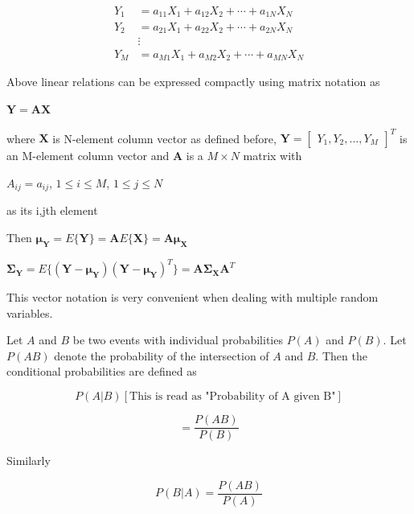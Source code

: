 \documentclass[fleqn]{article}
\begin{document}
	\begin{equation*}
		\begin{aligned}
			Y_1 &= a_{11}X_1 + a_{12}X_2 + \cdots + a_{1N}X_N \\
			Y_2 &= a_{21}X_1 + a_{22}X_2 + \cdots + a_{2N}X_N \\
			&\vdots \\
			Y_M &= a_{M1}X_1 + a_{M2}X_2 + \cdots + a_{MN}X_N
		\end{aligned}
	\end{equation*}
	
	Above linear relations can be expressed compactly using matrix notation as
	
	$\mathbf{Y} = \mathbf{AX}$
	
	where $\mathbf{X}$ is N-element column vector as defined before, $\mathbf{Y} = \begin{bmatrix}Y_1,Y_2,...,Y_M\end{bmatrix}^T$ is an M-element column vector and $\mathbf{A}$ is a $M \times N$ matrix with
	
	$A_{ij} = a_{ij}$, $1 \leq i \leq M$, $1 \leq j \leq N$
	
	as its i,jth element
	
	Then $\mathbf{\boldsymbol{\mu}_Y} = E\{\mathbf{Y}\} = \mathbf{A}E\{\mathbf{X}\} = \mathbf{A}\mathbf{\boldsymbol{\mu}_X}$
	
	$\mathbf{\Sigma_Y} = E\{(\mathbf{Y} - \mathbf{\boldsymbol{\mu}_Y})(\mathbf{Y} - \mathbf{\boldsymbol{\mu}_Y})^T\} = \mathbf{A}\mathbf{\Sigma_X}\mathbf{A}^T$
	
	This vector notation is very convenient when dealing with multiple random variables.
	
	Let $A$ and $B$ be two events with individual probabilities $P(A)$ and $P(B)$. Let $P(AB)$ denote the probability of the intersection of $A$ and $B$. Then the conditional probabilities are defined as
	
	\begin{equation*}
		P(A|B) \left[\text{This is read as "Probability of A given B"}\right]
	\end{equation*}
	
	\begin{equation*}
		= \frac{P(AB)}{P(B)}
	\end{equation*}
	
	Similarly
	
	\begin{equation*}
		P(B|A) = \frac{P(AB)}{P(A)}
	\end{equation*}
	
\end{document}
